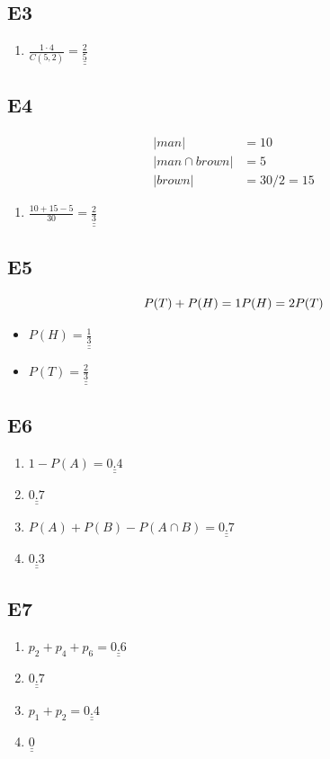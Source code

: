 \documentclass[12pt, a4paper]{article}
\begin{document}
\subsection* {E3}
\begin{enumerate}
  \item $\frac{1 \cdot 4}{ C(5, 2) } = \underline{\underline{ \frac{2}{5} }} $
\end{enumerate}

\subsection* {E4}
\begin{align*}
|man| &= 10 \\
|man \cap brown| &= 5 \\
|brown| &= 30 / 2 = 15
\end{align*}
\begin{enumerate}
  \item $\frac{10 + 15 - 5}{ 30 }= \underline{\underline{ \frac{2}{3} }} $
\end{enumerate}

\subsection* {E5}
$$
P(T)+P(H) = 1 \\
P(H) = 2P(T)
$$
\begin{itemize}
  \item $ P(H) = \underline{\underline{ \frac{1}{3} }} $
  \item $ P(T) = \underline{\underline{ \frac{2}{3} }} $
\end{itemize}


\subsection* {E6}
\begin{enumerate}
  \item $1 - P(A) = \underline{\underline{ 0.4 }} $
  \item $\underline{\underline{ 0.7 }} $
  \item $P(A) + P(B) - P (A \cap B)=\underline{\underline{ 0.7 }} $
  \item $\underline{\underline{ 0.3 }} $
\end{enumerate}

\subsection* {E7}
\begin{enumerate}
  \item $p_2 + p_4 + p_6 = \underline{\underline{ 0.6 }} $
  \item $\underline{\underline{ 0.7 }} $
  \item $p_1 + p_2 = \underline{\underline{ 0.4 }} $
  \item $\underline{\underline{ 0 }} $
\end{enumerate}
\end{document}
